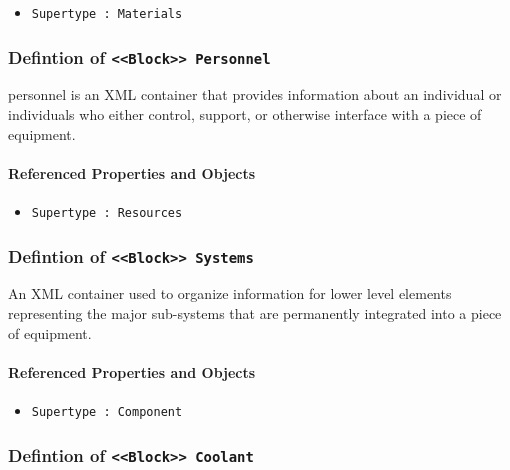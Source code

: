 \begin{itemize}
\item \texttt{Supertype : Materials}

\end{itemize}
\FloatBarrier
\subsubsection{Defintion of \texttt{<<Block>> Personnel}}
  \label{type:Personnel}

\FloatBarrier

personnel is an XML container that provides information about an individual or individuals who either control, support, or otherwise interface with a piece of equipment.


\FloatBarrier
\paragraph{Referenced Properties and Objects}

\begin{itemize}
\item \texttt{Supertype : Resources}

\end{itemize}
\FloatBarrier
\subsubsection{Defintion of \texttt{<<Block>> Systems}}
  \label{type:Systems}

\FloatBarrier

An XML container used to organize information for lower level elements representing the major sub-systems that are permanently integrated into a piece of equipment.

\FloatBarrier
\paragraph{Referenced Properties and Objects}

\begin{itemize}
\item \texttt{Supertype : Component}

\end{itemize}
\FloatBarrier
\subsubsection{Defintion of \texttt{<<Block>> Coolant}}
  \label{type:Coolant}

